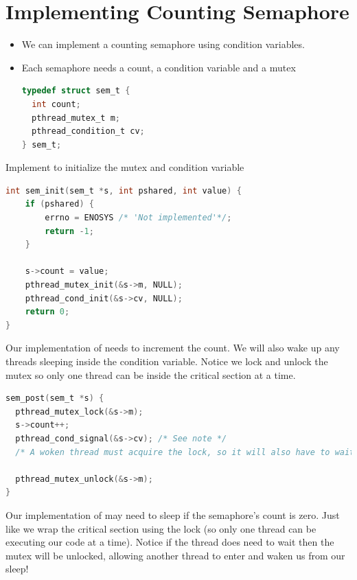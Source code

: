 \section{Implementing Counting Semaphore}\label{implementing-counting-semaphore}

\begin{itemize}
\item
  We can implement a counting semaphore using condition variables.
\item
  Each semaphore needs a count, a condition variable and a mutex

\begin{lstlisting}[language=C]
typedef struct sem_t {
  int count; 
  pthread_mutex_t m;
  pthread_condition_t cv;
} sem_t;
\end{lstlisting}
\end{itemize}

Implement  to initialize the mutex and condition variable

\begin{lstlisting}[language=C]
int sem_init(sem_t *s, int pshared, int value) {
    if (pshared) { 
        errno = ENOSYS /* 'Not implemented'*/; 
        return -1;
    }

    s->count = value;
    pthread_mutex_init(&s->m, NULL);
    pthread_cond_init(&s->cv, NULL);
    return 0;
}
\end{lstlisting}

Our implementation of  needs to increment the count. We will also wake up any threads sleeping inside the condition variable. Notice we lock and unlock the mutex so only one thread can be inside the critical section at a time.

\begin{lstlisting}[language=C]
sem_post(sem_t *s) {
  pthread_mutex_lock(&s->m);
  s->count++;
  pthread_cond_signal(&s->cv); /* See note */
  /* A woken thread must acquire the lock, so it will also have to wait until we call unlock*/

  pthread_mutex_unlock(&s->m);
}
\end{lstlisting}

Our implementation of  may need to sleep if the semaphore's count is zero. Just like  we wrap the critical section using the lock (so only one thread can be executing our code at a time). Notice if the thread does need to wait then the mutex will be unlocked, allowing another thread to enter  and waken us from our sleep!

